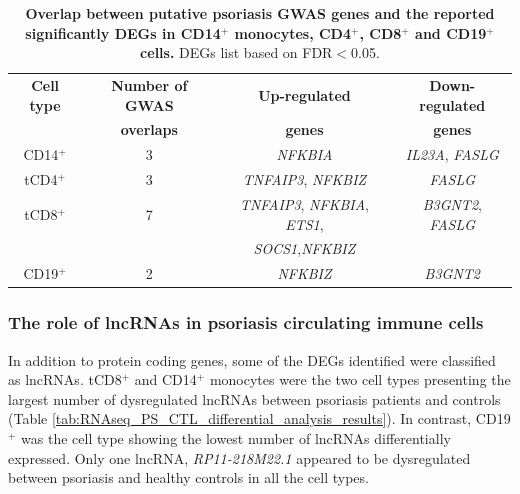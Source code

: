 \begin{table}[htbp]
\centering
\begin{tabular}{@{} c c c c}
\toprule
\textbf{Cell type}   & \textbf{Number of GWAS}   & \textbf{Up-regulated}   & \textbf{Down-regulated}  \\
										 & \textbf{overlaps}         & \textbf{genes}          &\textbf{genes} \\
\midrule
\midrule
CD14$^+$             & 3  & \textit{NFKBIA}                                   & \textit{IL23A}, \textit{FASLG}\\                 
tCD4$^+$              & 3  & \textit{TNFAIP3}, \textit{NFKBIZ}                 & \textit{FASLG} \\
tCD8$^+$              & 7  & \textit{TNFAIP3}, \textit{NFKBIA}, \textit{ETS1}, & \textit{B3GNT2}, \textit{FASLG} \\ 
                     &    & \textit{SOCS1},\textit{NFKBIZ}                    &  \\ 
CD19$^+$             & 2  & \textit{NFKBIZ}                                   & \textit{B3GNT2}\\
\bottomrule 
\end{tabular}
\medskip %
\caption[Overlap between putative psoriasis GWAS genes and the reported significantly DEGs in CD14$^+$ monocytes, CD4$^+$, CD8$^+$ and CD19$^+$ cells.]{\textbf{Overlap between putative psoriasis GWAS genes and the reported significantly DEGs in CD14$^+$ monocytes, CD4$^+$, CD8$^+$ and CD19$^+$ cells.} DEGs list based on FDR$<$0.05.}
\label{tab:RNAseq_PS_CTL_GWAS_overlap}
\end{table}
\bigskip %


\subsubsection{The role of lncRNAs in psoriasis circulating immune cells}

In addition to protein coding genes, some of the DEGs identified were classified as lncRNAs. tCD8$^+$ and CD14$^+$ monocytes were the two cell types presenting the largest number of dysregulated lncRNAs between psoriasis patients and controls (Table \ref{tab:RNAseq_PS_CTL_differential_analysis_results}). In contrast, CD19$^+$ was the cell type showing the lowest number of lncRNAs differentially expressed. Only one lncRNA, \textit{RP11-218M22.1} appeared to be dysregulated between psoriasis and healthy controls in all the cell types. 


